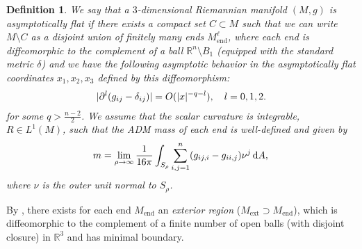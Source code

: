 \documentclass[draft]{amsart}
\newtheorem{definition}[theorem]{Definition}
\newcommand*{\mathcomma}{,}
\newcommand*{\mathfullstop}{.}
\newcommand*{\goesto}{\to}
\newcommand*{\reals}{\mathbb{R}}
\DeclareMathOperator{\trace}{tr}
\DeclarePairedDelimiter{\abs}{\lvert}{\rvert} %
\newcommand{\ext}{\mathrm{ext}} %
\newcommand{\Mend}{M_{\mathrm{end}}} %
\begin{document}
\begin{definition}
    We say that a \( 3 \)-dimensional 
    Riemannian manifold \( (M,g) \) 
    is asymptotically flat if there exists a compact set \( C \subset M \) such that we can write \( M\setminus C \) as a disjoint union of finitely many \emph{ends} \( M_{\mathrm{end}}^\ell \), where each end is diffeomorphic to the complement of a ball \( \reals^n\setminus B_1 \) (equipped with the standard metric \( \delta \)) and we have the following asymptotic behavior in the \emph{asymptotically flat coordinates} \( x_1,x_2,x_3\) defined by this diffeomorphism:
    \begin{equation}
        \begin{aligned}[t]
            \abs{\partial^l(g_{ij}-\delta_{ij})}&=O(\abs{x}^{-q-l}),\quad l=0,1,2\mathfullstop\\
        \end{aligned}
    \end{equation}
    for some \( q>\frac{n-2}{2} \). We assume that the scalar curvature is integrable, \( R \in L^1(M) \), such that the ADM mass of each end is well-defined and given by
    \begin{equation*}
        m=\lim_{\rho\goesto \infty} 
        \frac{1}{16\pi}
        \int_{S_\rho}\sum_{i,j=1}^{n}(g_{ij,i}-g_{ii,j})\nu^j 
        \odif{A}
        \mathcomma\\
    \end{equation*}
    where \( \nu \) is the outer unit normal to \( S_\rho \).
\end{definition}
By \cite[Lemma 4.1]{huiskenInverseMeanCurvature2001}, there exists for each end \( \Mend \) an \emph{exterior region} (\( M_\ext \supset \Mend \)), which is diffeomorphic to the complement of a finite number of open balls (with disjoint closure) in \( \reals^3 \) and has minimal boundary.
\end{document}
